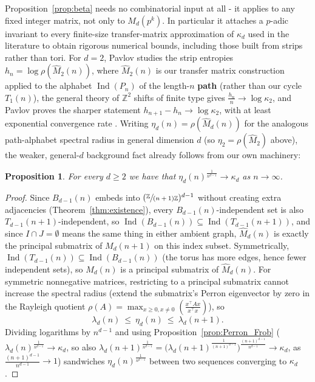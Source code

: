 \documentclass{article}
\theoremstyle{plain}
\newtheorem{proposition}[theorem]{Proposition}
\theoremstyle{definition}
\theoremstyle{remark}
\newcommand{\Z}{\mathbb{Z}}
\newcommand{\quot}[2]{\sfrac{#1}{#2}}
\DeclareMathOperator{\Ind}{Ind}
\begin{document}
Proposition~\ref{prop:beta} needs no combinatorial input at all - it applies to any fixed integer matrix, not only to $M_d(p^k)$. In particular it attaches a $p$-adic invariant to every finite-size transfer-matrix approximation of $\kappa_d$ used in the literature to obtain rigorous numerical bounds, including those built from strips rather than tori. For $d=2$, Pavlov studies the strip entropies $h_n=\log\rho(\widehat M_2(n))$, where $\widehat M_2(n)$ is our transfer matrix construction applied to the alphabet $\Ind(P_n)$ of the length-$n$ \textbf{path} (rather than our cycle $T_1(n)$), the general theory of $\Z^2$ shifts of finite type gives $\frac{h_n}{n}\to\log\kappa_2$, and Pavlov proves the sharper statement $h_{n+1}-h_n\to\log\kappa_2$, with at least exponential convergence rate \cite{Pavlov2012}. Writing $\eta_d(n)=\rho(\widehat M_d(n))$ for the analogous path-alphabet spectral radius in general dimension $d$ (so $\eta_2=\rho(\widehat M_2)$ above), the weaker, general-$d$ background fact already follows from our own machinery:

\begin{proposition}\label{prop:mu}
For every $d\ge2$ we have that $\eta_d(n)^{\frac{1}{n^{d-1}}}\to\kappa_d$ as $n\to\infty$.
\end{proposition}
\begin{proof}
Since $B_{d-1}(n)$ embeds into $(\quot{\Z}{(n+1)\Z})^{d-1}$ without creating extra adjacencies (Theorem~\ref{thm:existence}), every $B_{d-1}(n)$-independent set is also $T_{d-1}(n+1)$-independent, so $\Ind(B_{d-1}(n))\subseteq\Ind(T_{d-1}(n+1))$, and since $I\cap J=\emptyset$ means the same thing in either ambient graph, $\widehat M_d(n)$ is exactly the principal submatrix of $M_d(n+1)$ on this index subset. Symmetrically, $\Ind(T_{d-1}(n))\subseteq\Ind(B_{d-1}(n))$ (the torus has more edges, hence fewer independent sets), so $M_d(n)$ is a principal submatrix of $\widehat M_d(n)$. For symmetric nonnegative matrices, restricting to a principal submatrix cannot increase the spectral radius (extend the submatrix's Perron eigenvector by zero in the Rayleigh quotient $\rho(A)=\max_{x\ge0,x\ne0}\left(\frac{x^{\intercal}Ax}{x^\intercal x}\right)$), so
\[
\lambda_d(n)\ \le\ \eta_d(n)\ \le\ \lambda_d(n+1).
\]
Dividing logarithms by $n^{d-1}$ and using Proposition~\ref{prop:Perron_Frob} ($\lambda_d(n)^{\frac{1}{n^{d-1}}}\to\kappa_d$, so also $\lambda_d(n+1)^{\frac{1}{n^{d-1}}}=\big(\lambda_d(n+1)^{\frac{1}{(n+1)^{d-1}}}\big)^{\frac{(n+1)^{d-1}}{n^{d-1}}}\to\kappa_d$, as $\frac{(n+1)^{d-1}}{n^{d-1}}\to1$) sandwiches $\eta_d(n)^{\frac{1}{n^{d-1}}}$ between two sequences converging to $\kappa_d$.
\end{proof}
\end{document}
